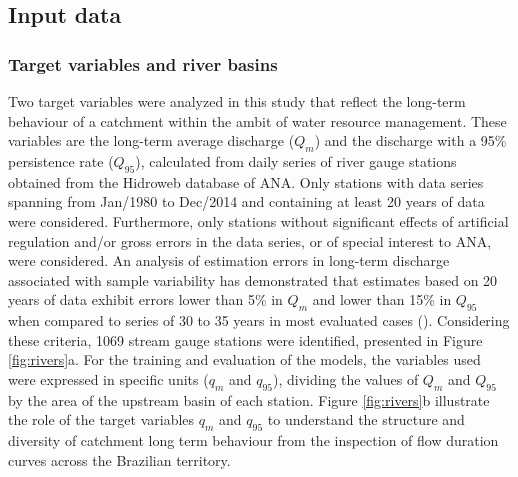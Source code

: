 \documentclass[12pt]{article}
\begin{document}
\subsection{Input data} \label{sec:datagen:input}

\subsubsection{Target variables and river basins} \label{sec:datagen:input:target}

\par Two target variables were analyzed in this study that reflect the long-term behaviour of a catchment within the ambit of water resource management. These variables are the long-term average discharge ($Q_{m}$) and the discharge with a 95\% persistence rate ($Q_{95}$), calculated from daily series of river gauge stations obtained from the Hidroweb database of ANA. Only stations with data series spanning from Jan/1980 to Dec/2014 and containing at least 20 years of data were considered. Furthermore, only stations without significant effects of artificial regulation and/or gross errors in the data series, or of special interest to ANA, were considered. An analysis of estimation errors in long-term discharge associated with sample variability  has demonstrated that estimates based on 20 years of data exhibit errors lower than 5\% in $Q_{m}$ and lower than 15\% in $Q_{95}$ when compared to series of 30 to 35 years in most evaluated cases (\cite{collischonn2021}). Considering these criteria, 1069 stream gauge stations were identified, presented in Figure \ref{fig:rivers}a. For the training and evaluation of the models, the variables used were expressed in specific units ($q_{m}$ and $q_{95}$), dividing the values of $Q_{m}$ and $Q_{95}$ by the area of the upstream basin of each station. Figure \ref{fig:rivers}b illustrate the role of the target variables $q_{m}$ and $q_{95}$ to understand the structure and diversity of  catchment long term behaviour from the inspection of flow duration curves across the Brazilian territory. 
\end{document}
